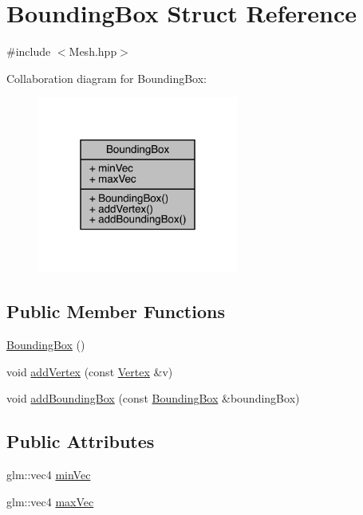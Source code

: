 \hypertarget{struct_bounding_box}{}\section{Bounding\+Box Struct Reference}
\label{struct_bounding_box}


{\ttfamily \#include $<$Mesh.\+hpp$>$}



Collaboration diagram for Bounding\+Box\+:\nopagebreak
\begin{figure}[H]
\begin{center}
\leavevmode
\includegraphics[width=187pt]{struct_bounding_box__coll__graph}
\end{center}
\end{figure}
\subsection*{Public Member Functions}
\begin{DoxyCompactItemize}
\item 
\hyperlink{struct_bounding_box_a6e401c4da5839950f1f30c8b8c4d1208}{Bounding\+Box} ()
\item 
void \hyperlink{struct_bounding_box_af49243215eee1a4a355262d0b948505d}{add\+Vertex} (const \hyperlink{struct_vertex}{Vertex} \&v)
\item 
void \hyperlink{struct_bounding_box_ad0e27df4662e1023c3e015898e126465}{add\+Bounding\+Box} (const \hyperlink{struct_bounding_box}{Bounding\+Box} \&bounding\+Box)
\end{DoxyCompactItemize}
\subsection*{Public Attributes}
\begin{DoxyCompactItemize}
\item 
glm\+::vec4 \hyperlink{struct_bounding_box_af0404f650a91d7c3212a2bd9db9ada56}{min\+Vec}
\item 
glm\+::vec4 \hyperlink{struct_bounding_box_a45c73eef0083449f657b8e25247123fd}{max\+Vec}
\end{DoxyCompactItemize}


